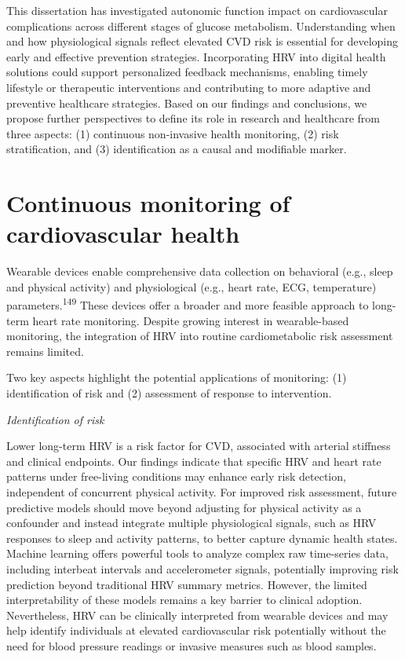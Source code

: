 \documentclass[
  letterpaper,
  headsepline=true,
  open=any]{scrbook}
\begin{document}
\newpage

This dissertation has investigated autonomic function impact on
cardiovascular complications across different stages of glucose
metabolism. Understanding when and how physiological signals reflect
elevated CVD risk is essential for developing early and effective
prevention strategies. Incorporating HRV into digital health solutions
could support personalized feedback mechanisms, enabling timely
lifestyle or therapeutic interventions and contributing to more adaptive
and preventive healthcare strategies. Based on our findings and
conclusions, we propose further perspectives to define its role in
research and healthcare from three aspects: (1) continuous non-invasive
health monitoring, (2) risk stratification, and (3) identification as a
causal and modifiable marker.

\hypertarget{continuous-monitoring-of-cardiovascular-health}{%
\section{Continuous monitoring of cardiovascular
health}\label{continuous-monitoring-of-cardiovascular-health}}

Wearable devices enable comprehensive data collection on behavioral
(e.g., sleep and physical activity) and physiological (e.g., heart rate,
ECG, temperature) parameters.\textsuperscript{149} These devices offer a
broader and more feasible approach to long-term heart rate monitoring.
Despite growing interest in wearable-based monitoring, the integration
of HRV into routine cardiometabolic risk assessment remains limited.

Two key aspects highlight the potential applications of monitoring: (1)
identification of risk and (2) assessment of response to intervention.

\emph{Identification of risk}

Lower long-term HRV is a risk factor for CVD, associated with arterial
stiffness and clinical endpoints. Our findings indicate that specific
HRV and heart rate patterns under free-living conditions may enhance
early risk detection, independent of concurrent physical activity. For
improved risk assessment, future predictive models should move beyond
adjusting for physical activity as a confounder and instead integrate
multiple physiological signals, such as HRV responses to sleep and
activity patterns, to better capture dynamic health states. Machine
learning offers powerful tools to analyze complex raw time-series data,
including interbeat intervals and accelerometer signals, potentially
improving risk prediction beyond traditional HRV summary metrics.
However, the limited interpretability of these models remains a key
barrier to clinical adoption. Nevertheless, HRV can be clinically
interpreted from wearable devices and may help identify individuals at
elevated cardiovascular risk potentially without the need for blood
pressure readings or invasive measures such as blood samples.
\end{document}
